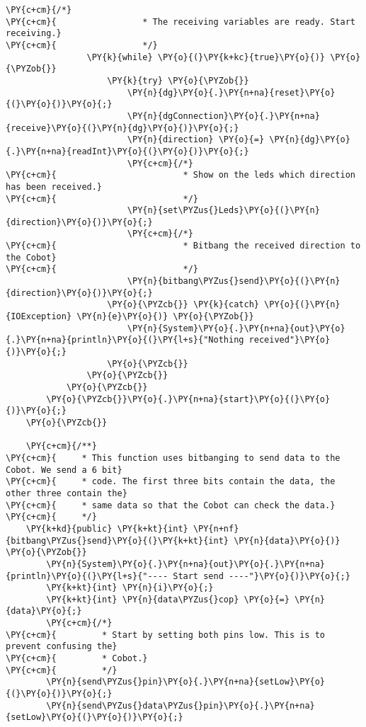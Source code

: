 \begin{Verbatim}[commandchars=\\\{\}]
                \PY{c+cm}{/*}
\PY{c+cm}{                 * The receiving variables are ready. Start receiving.}
\PY{c+cm}{                 */}
                \PY{k}{while} \PY{o}{(}\PY{k+kc}{true}\PY{o}{)} \PY{o}{\PYZob{}}
                    \PY{k}{try} \PY{o}{\PYZob{}}
                        \PY{n}{dg}\PY{o}{.}\PY{n+na}{reset}\PY{o}{(}\PY{o}{)}\PY{o}{;}
                        \PY{n}{dgConnection}\PY{o}{.}\PY{n+na}{receive}\PY{o}{(}\PY{n}{dg}\PY{o}{)}\PY{o}{;}
                        \PY{n}{direction} \PY{o}{=} \PY{n}{dg}\PY{o}{.}\PY{n+na}{readInt}\PY{o}{(}\PY{o}{)}\PY{o}{;}
                        \PY{c+cm}{/*}
\PY{c+cm}{                         * Show on the leds which direction has been received.}
\PY{c+cm}{                         */}
                        \PY{n}{set\PYZus{}Leds}\PY{o}{(}\PY{n}{direction}\PY{o}{)}\PY{o}{;}
                        \PY{c+cm}{/*}
\PY{c+cm}{                         * Bitbang the received direction to the Cobot}
\PY{c+cm}{                         */}
                        \PY{n}{bitbang\PYZus{}send}\PY{o}{(}\PY{n}{direction}\PY{o}{)}\PY{o}{;}
                    \PY{o}{\PYZcb{}} \PY{k}{catch} \PY{o}{(}\PY{n}{IOException} \PY{n}{e}\PY{o}{)} \PY{o}{\PYZob{}}
                        \PY{n}{System}\PY{o}{.}\PY{n+na}{out}\PY{o}{.}\PY{n+na}{println}\PY{o}{(}\PY{l+s}{"Nothing received"}\PY{o}{)}\PY{o}{;}
                    \PY{o}{\PYZcb{}}
                \PY{o}{\PYZcb{}}
            \PY{o}{\PYZcb{}}
        \PY{o}{\PYZcb{}}\PY{o}{.}\PY{n+na}{start}\PY{o}{(}\PY{o}{)}\PY{o}{;}
    \PY{o}{\PYZcb{}}

    \PY{c+cm}{/**}
\PY{c+cm}{     * This function uses bitbanging to send data to the Cobot. We send a 6 bit}
\PY{c+cm}{     * code. The first three bits contain the data, the other three contain the}
\PY{c+cm}{     * same data so that the Cobot can check the data.}
\PY{c+cm}{     */}
    \PY{k+kd}{public} \PY{k+kt}{int} \PY{n+nf}{bitbang\PYZus{}send}\PY{o}{(}\PY{k+kt}{int} \PY{n}{data}\PY{o}{)} \PY{o}{\PYZob{}}
        \PY{n}{System}\PY{o}{.}\PY{n+na}{out}\PY{o}{.}\PY{n+na}{println}\PY{o}{(}\PY{l+s}{"---- Start send ----"}\PY{o}{)}\PY{o}{;}
        \PY{k+kt}{int} \PY{n}{i}\PY{o}{;}
        \PY{k+kt}{int} \PY{n}{data\PYZus{}cop} \PY{o}{=} \PY{n}{data}\PY{o}{;}
        \PY{c+cm}{/*}
\PY{c+cm}{         * Start by setting both pins low. This is to prevent confusing the}
\PY{c+cm}{         * Cobot.}
\PY{c+cm}{         */}
        \PY{n}{send\PYZus{}pin}\PY{o}{.}\PY{n+na}{setLow}\PY{o}{(}\PY{o}{)}\PY{o}{;}
        \PY{n}{send\PYZus{}data\PYZus{}pin}\PY{o}{.}\PY{n+na}{setLow}\PY{o}{(}\PY{o}{)}\PY{o}{;}


\end{Verbatim}

